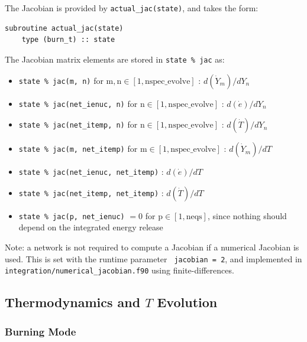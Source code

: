 The Jacobian is provided by {\tt actual\_jac(state)}, and takes the
form:
\begin{lstlisting}[language={[95]fortran}]
  subroutine actual_jac(state)
    type (burn_t) :: state
\end{lstlisting}
The Jacobian matrix elements are stored in {\tt state \% jac} as:
\begin{itemize}
\item {\tt state \% jac(m, n)} for $\mathrm{m}, \mathrm{n} \in [1, \mathrm{nspec\_evolve}]$ :
  $d(\dot{Y}_m)/dY_n$

\item {\tt state \% jac(net\_ienuc, n)} for $\mathrm{n} \in [1, \mathrm{nspec\_evolve}]$ :
  $d(\dot{e})/dY_n$

\item {\tt state \% jac(net\_itemp, n)} for $\mathrm{n} \in [1, \mathrm{nspec\_evolve}]$ :
  $d(\dot{T})/dY_n$

\item {\tt state \% jac(m, net\_itemp)} for $\mathrm{m} \in [1, \mathrm{nspec\_evolve}]$ :
  $d(\dot{Y}_m)/dT$

\item {\tt state \% jac(net\_ienuc, net\_itemp)} :
  $d(\dot{e})/dT$

\item {\tt state \% jac(net\_itemp, net\_itemp)} :
  $d(\dot{T})/dT$

\item {\tt state \% jac(p, net\_ienuc)} $= 0$ for $\mathrm{p} \in [1, \mathrm{neqs}]$, since nothing
  should depend on the integrated energy release

\end{itemize}


Note: a network is not required to compute a Jacobian if a numerical
Jacobian is used.  This is set with the runtime parameter {\tt
  jacobian = 2}, and implemented in {\tt
  integration/numerical\_jacobian.f90} using finite-differences.




\subsection{Thermodynamics and $T$ Evolution}

\subsubsection{Burning Mode}


